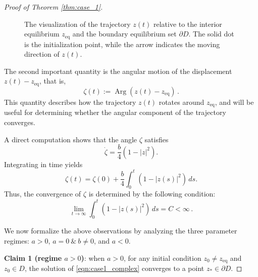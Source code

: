 \documentclass[10pt]{article}
\theoremstyle{definition}
\theoremstyle{definition}
\newtheorem{remark}[theorem]{Remark}
\numberwithin{equation}{section}
\newcommand{\Arg}{\operatorname{Arg}}
\newcommand{\zeq}{z_{\mathrm{eq}}}
\begin{document}
\begin{proof}[Proof of Theorem \ref{thm:case_1}]
\begin{figure}[!htb]
\caption{The visualization of the trajectory $z(t)$ relative to the interior equilibrium $\zeq$ and the boundary equilibrium set $\partial D$.
The solid dot is the initialization point, while the arrow indicates the moving direction of $z(t)$.
}
    \label{fig:z_trajectory}
\end{figure}

The second important quantity is the angular motion of the displacement $z(t) - z_\mathrm{eq}$, that is,
\begin{equation}\label{eq:z_polar}
     \zeta(t) := \Arg(z(t) - \zeq) \, .
\end{equation} 
This quantity describes how the trajectory $z(t)$ rotates around $\zeq$, and will be useful for 
determining whether the angular component of the trajectory converges.

A direct computation shows that the angle $\zeta$ satisfies
\begin{equation}
    \label{eqn:case1-angle-dynamics}
        \dot{\zeta} = \frac{b} 4 (1 - |z|^2).
\end{equation}
Integrating in time yields
\begin{equation}
    \label{eqn:case1-angle-integral}
    \zeta(t) = \zeta(0) + \frac{b}{4}\int_0^t (1-|z(s)|^2)\,ds.
\end{equation}
Thus, the convergence of $\zeta$ is determined by the following condition:
\begin{equation}\label{eq:case1-finite-integral}
    \lim_{t \rightarrow \infty} \int_0^{t} (1 - |z(s)|^2) \, ds = C < \infty \, .
\end{equation}

We now formalize the above observations by analyzing the three parameter regimes: $a > 0$, $a = 0 \ \& \ b \neq 0$, and $a < 0$.
    

    \textbf{Claim 1 (regime $a>0$)}: when $a > 0$, for any initial condition $z_0 \neq z_\mathrm{eq}$ and $z_0 \in D$, the solution of \eqref{eqn:case1_complex} converges to a point $z_* \in \partial D$.


\end{proof}
\end{document}
